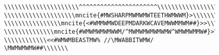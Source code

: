 \documentclass{metanorma}
\begin{document}
\begin{figure}[h]
\begin{verbatim}
\\\\\\\\\\\\\\\\\\\\\^^^^^^^^^^^^^^^^^^^^^^\\\\\\\\\\\\\\\\\
\\\\\\\\\\\\\\\\\\\\mncite{#MWSHARPMWMWMWTEETHWMWWM}>\\\\\\\\\\\\
\\\\\\\\\\\\\\\\mncite{<#WMMWMWDEEPMDARKWCAVEMWWMMWM##}>>\\\\\\\\
\\\\\\\\\\\\\\mncite{#WMWMWMWMWWM/^MWMWMWMWMWMW^WMWMWMMW#}>\\\\\\
\\\\\\\\\\\\<<#WMWMBEASTMW% //\MWABBITWMW/ \MWMWMWMW##\\\\\\\

\end{verbatim}
\end{figure}
\end{document}
